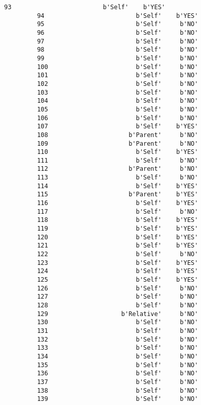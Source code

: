 \documentclass[11pt]{article}
\begin{document}
\begin{Verbatim}[commandchars=\\\{\}]
         93                         b'Self'    b'YES'  
         94                         b'Self'    b'YES'  
         95                         b'Self'     b'NO'  
         96                         b'Self'     b'NO'  
         97                         b'Self'     b'NO'  
         98                         b'Self'     b'NO'  
         99                         b'Self'     b'NO'  
         100                        b'Self'     b'NO'  
         101                        b'Self'     b'NO'  
         102                        b'Self'     b'NO'  
         103                        b'Self'     b'NO'  
         104                        b'Self'     b'NO'  
         105                        b'Self'     b'NO'  
         106                        b'Self'     b'NO'  
         107                        b'Self'    b'YES'  
         108                      b'Parent'     b'NO'  
         109                      b'Parent'     b'NO'  
         110                        b'Self'    b'YES'  
         111                        b'Self'     b'NO'  
         112                      b'Parent'     b'NO'  
         113                        b'Self'     b'NO'  
         114                        b'Self'    b'YES'  
         115                      b'Parent'    b'YES'  
         116                        b'Self'    b'YES'  
         117                        b'Self'     b'NO'  
         118                        b'Self'    b'YES'  
         119                        b'Self'    b'YES'  
         120                        b'Self'    b'YES'  
         121                        b'Self'    b'YES'  
         122                        b'Self'     b'NO'  
         123                        b'Self'    b'YES'  
         124                        b'Self'    b'YES'  
         125                        b'Self'    b'YES'  
         126                        b'Self'     b'NO'  
         127                        b'Self'     b'NO'  
         128                        b'Self'     b'NO'  
         129                    b'Relative'     b'NO'  
         130                        b'Self'     b'NO'  
         131                        b'Self'     b'NO'  
         132                        b'Self'     b'NO'  
         133                        b'Self'     b'NO'  
         134                        b'Self'     b'NO'  
         135                        b'Self'     b'NO'  
         136                        b'Self'     b'NO'  
         137                        b'Self'     b'NO'  
         138                        b'Self'     b'NO'  
         139                        b'Self'     b'NO'  

\end{Verbatim}
\end{document}
